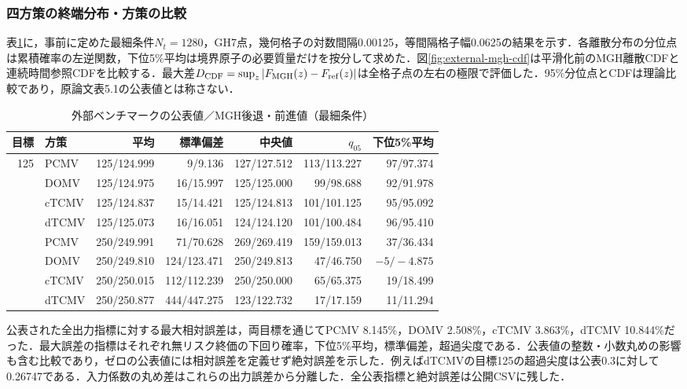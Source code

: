 \documentclass[10pt,a4paper]{article}
\theoremstyle{plain}
\theoremstyle{definition}
\begin{document}
\subsubsection{四方策の終端分布・方策の比較}

表\ref{tab:vanstaden-all-mv-validation}に，事前に定めた最細条件$N_t=1280$，GH7点，幾何格子の対数間隔0.00125，等間隔格子幅0.0625の結果を示す．各離散分布の分位点は累積確率の左逆関数，下位5\%平均は境界原子の必要質量だけを按分して求めた．図\ref{fig:external-mgh-cdf}は平滑化前のMGH離散CDFと連続時間参照CDFを比較する．最大差$D_{\rm CDF}=\sup_z|F_{\rm MGH}(z)-F_{\rm ref}(z)|$は全格子点の左右の極限で評価した．95\%分位点とCDFは理論比較であり，原論文表5.1の公表値とは称さない．

\begin{table}[htbp]
\centering
\caption{外部ベンチマークの公表値／MGH後退・前進値（最細条件）}
\label{tab:vanstaden-all-mv-validation}
\scriptsize
\setlength{\tabcolsep}{3.2pt}
\begin{tabular}{@{}rlrrrrr@{}}
\toprule
目標 & 方策 & 平均 & 標準偏差 & 中央値 & $q_{05}$ & 下位5\%平均 \\
\midrule
125 & PCMV & 125/124.999 & 9/9.136 & 127/127.512 & 113/113.227 & 97/97.374 \\
 & DOMV & 125/124.975 & 16/15.997 & 125/125.000 & 99/98.688 & 92/91.978 \\
 & cTCMV & 125/124.837 & 15/14.421 & 125/124.813 & 101/101.125 & 95/95.092 \\
 & dTCMV & 125/125.073 & 16/16.051 & 124/124.120 & 101/100.484 & 96/95.410 \\
\addlinespace
250 & PCMV & 250/249.991 & 71/70.628 & 269/269.419 & 159/159.013 & 37/36.434 \\
 & DOMV & 250/249.810 & 124/123.471 & 250/249.813 & 47/46.750 & $-5/-4.875$ \\
 & cTCMV & 250/250.015 & 112/112.239 & 250/250.000 & 65/65.375 & 19/18.499 \\
 & dTCMV & 250/250.877 & 444/447.275 & 123/122.732 & 17/17.159 & 11/11.294 \\
\bottomrule
\end{tabular}
\end{table}

公表された全出力指標に対する最大相対誤差は，両目標を通じてPCMV 8.145\%，DOMV 2.508\%，cTCMV 3.863\%，dTCMV 10.844\%だった．最大誤差の指標はそれぞれ無リスク終価の下回り確率，下位5\%平均，標準偏差，超過尖度である．公表値の整数・小数丸めの影響も含む比較であり，ゼロの公表値には相対誤差を定義せず絶対誤差を示した．例えばdTCMVの目標125の超過尖度は公表0.3に対して0.26747である．入力係数の丸め差はこれらの出力誤差から分離した．全公表指標と絶対誤差は公開CSVに残した．
\end{document}
